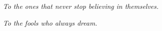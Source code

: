 \chapter*{ }
\label{cha:dedication}
\begin{flushright}
\textit{To the ones that never stop believing in themselves.}

\vspace{3mm}
\textit{To the fools who always dream.}

\end{flushright}


